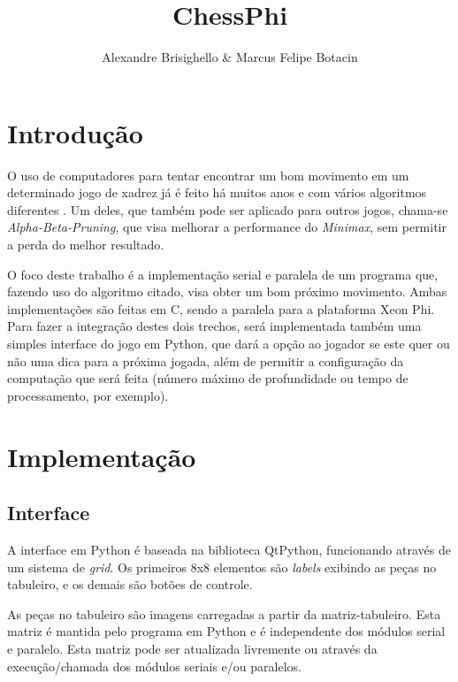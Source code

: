 \documentclass[12pt,a4paper,final]{article}
\author{Alexandre Brisighello \& Marcus Felipe Botacin}
\title{ChessPhi}
\begin{document}
\onehalfspace %

\maketitle
\newpage
\tableofcontents
\newpage


\section{Introdução}

O uso de computadores para tentar encontrar um bom movimento em um determinado jogo de xadrez já é feito há muitos anos e com vários algoritmos diferentes . Um deles, que também pode ser aplicado para outros jogos, chama-se \textit{Alpha-Beta-Pruning}, que visa melhorar a performance do \textit{Minimax}, sem permitir a perda do melhor resultado.

O foco deste trabalho é a implementação serial e paralela de um programa que, fazendo uso do algoritmo citado, visa obter um bom próximo movimento. Ambas implementações são feitas em C, sendo a paralela para a plataforma Xeon Phi. Para fazer a integração destes dois trechos, será implementada também uma simples interface do jogo em Python, que dará a opção ao jogador se este quer ou não uma dica para a próxima jogada, além de permitir a configuração da computação que será feita (número máximo de profundidade ou tempo de processamento, por exemplo). 

\section{Implementação}

\subsection{Interface}

A interface em Python é baseada na biblioteca QtPython, funcionando através de um sistema de \textit{grid}. Os primeiros 8x8 elementos são \textit{labels} exibindo as peças no tabuleiro, e os demais são botões de controle. 

As peças no tabuleiro são imagens carregadas a partir da matriz-tabuleiro. Esta matriz é mantida pelo programa em Python e é independente dos módulos serial e paralelo. Esta matriz pode ser atualizada livremente ou através da execução/chamada dos módulos seriais e/ou paralelos.
\end{document}
